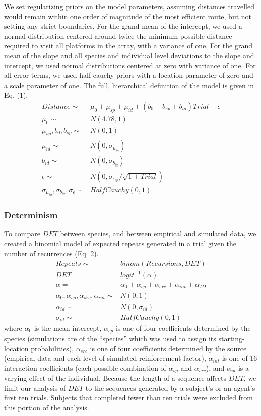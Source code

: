 \documentclass[twoside,12pt,final]{ucthesis-CA2012}
\begin{document}
\begin{ucmainmatter}
We set regularizing priors on the model parameters, assuming distances travelled would remain within one order of magnitude of the most efficient route, but not setting any strict boundaries. For the grand mean of the intercept, we used a normal distribution centered around twice the minimum possible distance required to visit all platforms in the array, with a variance of one. For the grand mean of the slope and all species and individual level deviations to the slope and intercept, we used normal distributions centered at zero with variance of one. For all error terms, we used half-cauchy priors with a location parameter of zero and a scale parameter of one. The full, hierarchical definition of the model is given in Eq. (1).
\begin{align*}
Distance \sim & \mu_0 + \mu_{sp} +\mu_{id} +(b_0 + b_{sp} +b_{id})Trial+ \epsilon \\
\mu_0 \sim & N(4.78,1) \\
\mu_{sp} ,b_0,b_{sp} \sim & N(0,1) \\
\mu_{id} \sim & N(0,\sigma_{\mu_{id}}) \\
b_{id} \sim & N(0,\sigma_{b_{id}}) \\
\epsilon \sim & N(0,\sigma_{\epsilon_{sp}}/\sqrt{1+Trial}) \\
\sigma_{\mu_{id}},\sigma_{b_{id}},\sigma_{\epsilon} \sim & HalfCauchy(0,1)
\end{align*}
\hypertarget{determinism-1}{%
\subsubsection{Determinism}\label{determinism-1}}

To compare \(DET\) between species, and between empirical and simulated data, we created a binomial model of expected repeats generated in a trial given the number of recurrences (Eq. 2).
\begin{align*}
Repeats \sim & binom(Recursions,DET) \\
DET = & logit^{-1}(\alpha) \\
\alpha= & \alpha_0 + \alpha_{sp}+\alpha_{src}+\alpha_{int}+\alpha_{ID} \\
\alpha_0,\alpha_{sp},\alpha_{src},\alpha_{int} \sim & N(0,1) \\
\alpha_{id} \sim & N(0,\sigma_{id}) \\
\sigma_{id} \sim & HalfCauchy(0,1)
\end{align*}
where \(\alpha_0\) is the mean intercept, \(\alpha_{sp}\) is one of four coefficients determined by the species (simulations are of the ``species'' which was used to assign its starting-location probabilities), \(\alpha_{src}\) is one of four coefficients determined by the source (empirical data and each level of simulated reinforcement factor), \(\alpha_{int}\) is one of 16 interaction coefficients (each possible combination of \(\alpha_{sp}\) and \(\alpha_{src}\)), and \(\alpha_{id}\) is a varying effect of the individual. Because the length of a sequence affects \(DET\), we limit our analysis of \(DET\) to the sequences generated by a subject's or an agent's first ten trials. Subjects that completed fewer than ten trials were excluded from this portion of the analysis.


\end{ucmainmatter}
\end{document}
